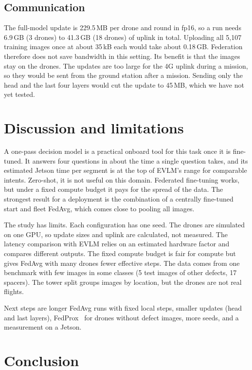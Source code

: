 \documentclass[preprint,12pt]{elsarticle}
\begin{document}
\subsection{Communication}

The full-model update is 229.5\,MB per drone and round in fp16, so a run needs 6.9\,GB (3 drones) to 41.3\,GB (18 drones) of uplink in total. Uploading all 5,107 training images once at about 35\,kB each would take about 0.18\,GB. Federation therefore does not save bandwidth in this setting. Its benefit is that the images stay on the drones. The updates are too large for the 4G uplink during a mission, so they would be sent from the ground station after a mission. Sending only the head and the last four layers would cut the update to 45\,MB, which we have not yet tested.

\section{Discussion and limitations}

A one-pass decision model is a practical onboard tool for this task once it is fine-tuned. It answers four questions in about the time a single question takes, and its estimated Jetson time per segment is at the top of EVLM's range for comparable intents. Zero-shot, it is not useful on this domain. Federated fine-tuning works, but under a fixed compute budget it pays for the spread of the data. The strongest result for a deployment is the combination of a centrally fine-tuned start and fleet FedAvg, which comes close to pooling all images.

The study has limits. Each configuration has one seed. The drones are simulated on one GPU, so update sizes and uplink are calculated, not measured. The latency comparison with EVLM relies on an estimated hardware factor and compares different outputs. The fixed compute budget is fair for compute but gives FedAvg with many drones fewer effective steps. The data comes from one benchmark with few images in some classes (5 test images of other defects, 17 spacers). The tower split groups images by location, but the drones are not real flights.

Next steps are longer FedAvg runs with fixed local steps, smaller updates (head and last layers), FedProx~\cite{fedprox} for drones without defect images, more seeds, and a measurement on a Jetson.

\section{Conclusion}
\end{document}
